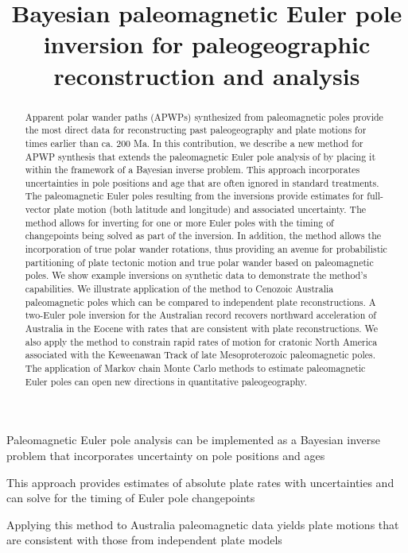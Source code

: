 \documentclass[]{agujournal2019}
\begin{document}
\title{Bayesian paleomagnetic Euler pole inversion for paleogeographic reconstruction and analysis}





\begin{keypoints}
\item Paleomagnetic Euler pole analysis can be implemented as a Bayesian inverse problem that incorporates uncertainty on pole positions and ages
\item This approach provides estimates of absolute plate rates with uncertainties and can solve for the timing of Euler pole changepoints
\item Applying this method to Australia paleomagnetic data yields plate motions that are consistent with those from independent plate models
\end{keypoints}

\begin{abstract}
Apparent polar wander paths (APWPs) synthesized from paleomagnetic poles provide the most direct data for reconstructing past paleogeography and plate motions for times earlier than ca. 200 Ma. In this contribution, we describe a new method for APWP synthesis that extends the paleomagnetic Euler pole analysis of  by placing it within the framework of a Bayesian inverse problem. This approach incorporates uncertainties in pole positions and age that are often ignored in standard treatments. The paleomagnetic Euler poles resulting from the inversions provide estimates for full-vector plate motion (both latitude and longitude) and associated uncertainty. The method allows for inverting for one or more Euler poles with the timing of changepoints being solved as part of the inversion. In addition, the method allows the incorporation of true polar wander rotations, thus providing an avenue for probabilistic partitioning of plate tectonic motion and true polar wander based on paleomagnetic poles. We show example inversions on synthetic data to demonstrate the method's capabilities. We illustrate application of the method to Cenozoic Australia paleomagnetic poles which can be compared to independent plate reconstructions. A two-Euler pole inversion for the Australian record recovers northward acceleration of Australia in the Eocene with rates that are consistent with plate reconstructions. We also apply the method to constrain rapid rates of motion for cratonic North America associated with the Keweenawan Track of late Mesoproterozoic paleomagnetic poles. The application of Markov chain Monte Carlo methods to estimate paleomagnetic Euler poles can open new directions in quantitative paleogeography.
\end{abstract}
\end{document}
